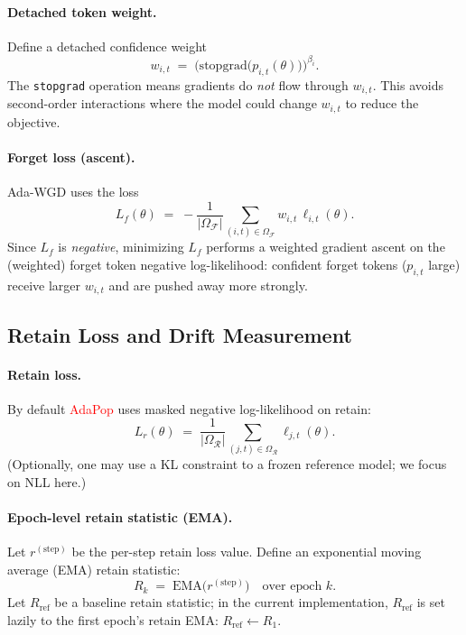   \paragraph{Detached token weight.}
  Define a detached confidence weight
  \[
  w_{i,t} \;=\; \Big(\mathrm{stopgrad}\big(p_{i,t}(\theta)\big)\Big)^{\beta_i}.
  \]
  The \texttt{stopgrad} operation means gradients do \emph{not} flow through $w_{i,t}$.
  This avoids second-order interactions where the model could change $w_{i,t}$ to reduce the objective.

  \paragraph{Forget loss (ascent).}
  Ada-WGD uses the loss
  \[
  L_f(\theta)
  \;=\;
  -\frac{1}{|\Omega_{\mathcal{F}}|}
  \sum_{(i,t)\in\Omega_{\mathcal{F}}}
  w_{i,t}\,\ell_{i,t}(\theta).
  \]
  Since $L_f$ is \emph{negative}, minimizing $L_f$ performs a weighted gradient ascent on the (weighted)
  forget token negative log-likelihood: confident forget tokens ($p_{i,t}$ large) receive larger $w_{i,t}$
  and are pushed away more strongly.

  \subsection{Retain Loss and Drift Measurement}

  \paragraph{Retain loss.}
  By default \textcolor{red}{AdaPop} uses masked negative log-likelihood on retain:
  \[
  L_r(\theta)
  \;=\;
  \frac{1}{|\Omega_{\mathcal{R}}|}
  \sum_{(j,t)\in\Omega_{\mathcal{R}}}
  \ell_{j,t}(\theta).
  \]
  (Optionally, one may use a KL constraint to a frozen reference model; we focus on NLL here.)

  \paragraph{Epoch-level retain statistic (EMA).}
  Let $r^{(\mathrm{step})}$ be the per-step retain loss value.
  Define an exponential moving average (EMA) retain statistic:
  \[
  R_k \;=\; \mathrm{EMA}\big(r^{(\mathrm{step})}\big)\quad \text{over epoch }k.
  \]
  Let $R_{\mathrm{ref}}$ be a baseline retain statistic; in the current implementation,
  $R_{\mathrm{ref}}$ is set lazily to the first epoch's retain EMA: $R_{\mathrm{ref}}\leftarrow R_1$.

